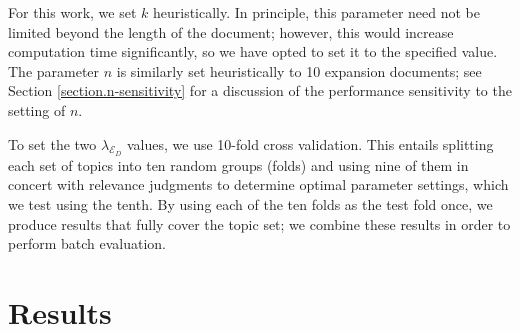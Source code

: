 \documentclass{sig-alternate}
\begin{document}
For this work, we set $k$ heuristically. In principle, this parameter need not be limited beyond the length of the document; however, this would increase computation time significantly, so we have opted to set it to the specified value. The parameter $n$ is similarly set heuristically to 10 expansion documents; see Section \ref{section.n-sensitivity} for a discussion of the performance sensitivity to the setting of $n$.


To set the two $\lambda_{\mathcal{E}_D}$ values, we use 10-fold cross validation. This entails splitting each set of topics into ten random groups (folds) and using nine of them in concert with relevance judgments to determine optimal parameter settings, which we test using the tenth. By using each of the ten folds as the test fold once, we produce results that fully cover the topic set; we combine these results in order to perform batch evaluation. 

\section{Results}\label{section.results}
\end{document}
